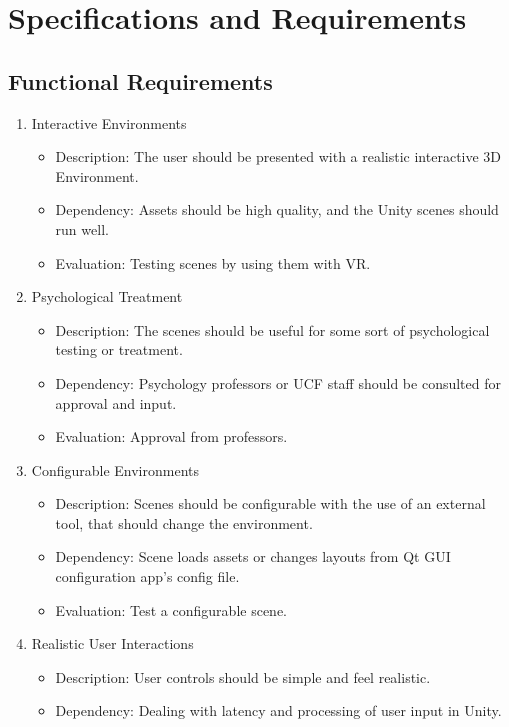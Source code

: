 \documentclass[a4paper,10pt]{article}
\begin{document}
	
	
	\pagebreak
\section{Specifications and Requirements}
	\subsection{Functional Requirements}
	\begin{enumerate}
		\item Interactive Environments
		\begin{itemize}
		\item Description: The user should be presented with a realistic interactive 3D Environment. 
		\item Dependency: Assets should be high quality, and the Unity scenes should run well.
		\item Evaluation: Testing scenes by using them with VR.
		\end{itemize}
		\item Psychological Treatment
		\begin{itemize}
		\item Description: The scenes should be useful for some sort of psychological testing or treatment.
		\item Dependency:  Psychology professors or UCF staff should be consulted for approval and input.
		\item Evaluation:  Approval from professors. 
		\end{itemize}
		\item Configurable Environments
		\begin{itemize} 
		\item Description: Scenes should be configurable with the use of an external tool, that should change the environment. 
		\item Dependency:  Scene loads assets or changes layouts from Qt GUI configuration app's config file. 
		\item Evaluation:  Test a configurable scene.
		\end{itemize}
		\item Realistic User Interactions
		\begin{itemize}
		\item Description: User controls should be simple and feel realistic. 
		\item Dependency:  Dealing with latency and processing of user input in Unity. 

\end{itemize}
\end{enumerate}
\end{document}
